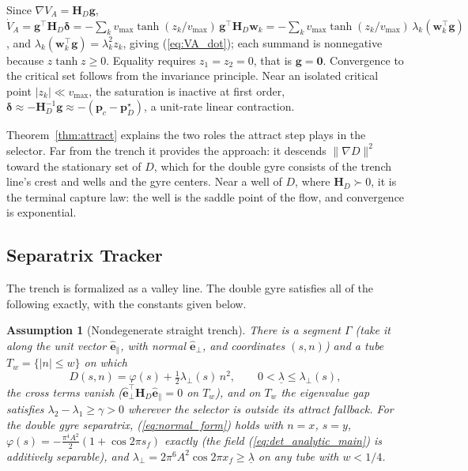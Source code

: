 \documentclass[lettersize,journal]{IEEEtran}
\newtheorem{assumption}{Assumption}
\begin{document}
\begin{IEEEproof}
Since $\nabla V_A = \mathbf{H}_D \mathbf{g}$,
$\dot{V}_A = \mathbf{g}^\top \mathbf{H}_D \boldsymbol{\delta}
= -\sum_k v_{\max} \tanh(z_k/v_{\max})\,
\mathbf{g}^\top \mathbf{H}_D \mathbf{w}_k
= -\sum_k v_{\max} \tanh(z_k/v_{\max})\,\lambda_k
(\mathbf{w}_k^\top\mathbf{g})$, and $\lambda_k(\mathbf{w}_k^\top
\mathbf{g}) = \lambda_k^2 z_k$, giving (\ref{eq:VA_dot}); each summand
is nonnegative because $z\tanh z \geq 0$. Equality requires $z_1 = z_2 =
0$, that is $\mathbf{g} = \mathbf{0}$. Convergence to the critical set
follows from the invariance principle. Near an isolated critical point
$|z_k| \ll v_{\max}$, the saturation is inactive at first order,
$\boldsymbol{\delta} \approx -\mathbf{H}_D^{-1}\mathbf{g} \approx
-(\mathbf{p}_c - \mathbf{p}^\star_D)$, a unit-rate linear contraction.
\end{IEEEproof}

Theorem~\ref{thm:attract} explains the two roles the attract step plays
in the selector. Far from the trench it provides the approach: it descends
$\|\nabla D\|^2$ toward the stationary set of $D$, which for the double
gyre consists of the trench line's crest and wells and the gyre
centers. Near a well of $D$, where $\mathbf{H}_D \succ 0$, it is the
terminal capture law: the well is the saddle point of the flow, and
convergence is exponential.

\subsection{Separatrix Tracker}
\label{sec:stab_sep}

The trench is formalized as a valley line. The double gyre satisfies all
of the following exactly, with the constants given below.

\begin{assumption}[Nondegenerate straight trench]
\label{ass:trench}
There is a segment $\Gamma$ (take it along the unit vector
$\hat{\mathbf{e}}_\parallel$, with normal $\hat{\mathbf{e}}_\perp$, and
coordinates $(s, n)$) and a tube $T_w = \{|n| \leq w\}$ on which
\begin{equation}
    D(s, n) = \varphi(s) + \tfrac{1}{2}\lambda_\perp(s)\,n^2,
    \qquad 0 < \underline{\lambda} \leq \lambda_\perp(s),
    \label{eq:normal_form}
\end{equation}
the cross terms vanish
($\hat{\mathbf{e}}_\perp^\top \mathbf{H}_D \hat{\mathbf{e}}_\parallel
= 0$ on $T_w$), and on $T_w$ the eigenvalue gap satisfies
$\lambda_2 - \lambda_1 \geq \gamma > 0$ wherever the selector is
outside its attract fallback. For the double gyre separatrix,
(\ref{eq:normal_form}) holds with $n = x$, $s = y$, $\varphi(s) =
-\tfrac{\pi^4 A^2}{2}(1 + \cos 2\pi s_f)$ exactly (the field
(\ref{eq:det_analytic_main}) is additively separable), and
$\lambda_\perp = 2\pi^6 A^2 \cos 2\pi x_f \geq \underline{\lambda}$ on
any tube with $w < 1/4$.
\end{assumption}
\end{document}

